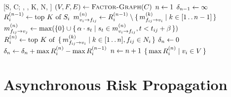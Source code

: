 \begin{function}[H]{\nSyncRiskProp}[S, C; \pTransRate, \pTimeBuffer, K, N, \diff]
\State $(\vVariables, \vFactors, \vEdges) \assign \Call{Factor-Graph}{C}$
\State $n \leftarrow 1$
\State $\diff[n -1] \assign \infty$
\ForEach{$\vVariable[i] \in \vVariables$}
	\State $R_{i}^{(n - 1)} \leftarrow \text{top } K \text{ of } S_i$
\EndFor
{}
	\ForEach{$\{\vVariable[i], \vFactor[ij]\} \in \vEdges$}
		\State $\vVariableMsg{i}{ij}{n} \assign \scores{i}{n - 1} \setminus \setbuilder{\vFactorMsg{ij}{i}{k}}{k \in [1 \ltwodots n - 1]}$
	\EndFor
	\ForEach{$\{\vVariable[i], \vFactor[ij]\} \in \vEdges$}
		\State $\vFactorMsg{ij}{j}{n} \assign \max (\{0\} \cup \setbuilder{\pTransRate \cdot \vScore_\vTime}{\vScore_\vTime \in \vVariableMsg{i}{ij}{n}, \vTime < \vTime_{ij} + \pTimeBuffer})$
	\EndFor
	\ForEach{$\vVariable[i] \in \vVariables$}
		\State $\scores{i}{n} \assign \topK{\setbuilder{\vFactorMsg{ij}{i}{k}}{k \in [1 \ltwodots n], \vFactor[ij] \in \neighbors_i}}$
	\EndFor
	\State $\diff[n] \assign 0$
	\ForEach{$\vVariable[i] \in \vVariables$}
		\State $\diff[n] \assign \diff[n] + \max \scores{i}{n} - \max \scores{i}{n - 1}$
	\EndFor
	\State $n \leftarrow n + 1$
\EndWhile
\State \Return $\setbuilder{\max \scores{i}{n}}{\vVariable[i] \in \vVariables}$
\end{function}

\section{Asynchronous Risk Propagation}\label{sec:vertices-to-actors}

